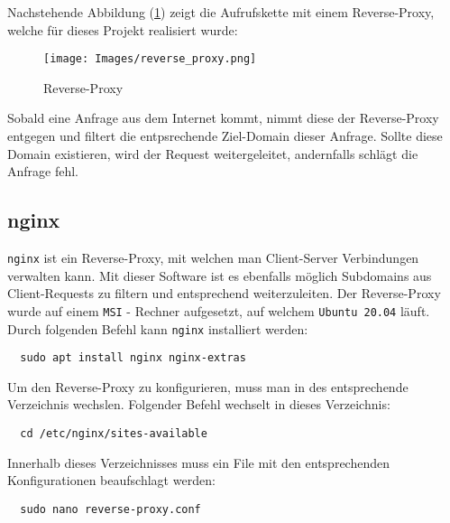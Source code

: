\documentclass[paper=a4,12pt]{scrreprt}
\begin{document}
Nachstehende Abbildung (\ref{fig:reverse_proxy}) zeigt die Aufrufskette mit einem Reverse-Proxy, welche für dieses Projekt realisiert wurde:\newline

\begin{figure}[H]
  \centering
  \texttt{[image: Images/reverse\_proxy.png]}
  \caption{Reverse-Proxy}
  \label{fig:reverse_proxy}
\end{figure}

Sobald eine Anfrage aus dem Internet kommt, nimmt diese der Reverse-Proxy entgegen und filtert die entpsrechende Ziel-Domain dieser Anfrage. Sollte diese Domain existieren, wird der Request weitergeleitet, andernfalls schlägt die Anfrage fehl.\newline


\subsection{nginx}
\label{ssec:nginx}

\texttt{nginx}\cite{nginx} ist ein Reverse-Proxy, mit welchen man Client-Server Verbindungen verwalten kann. Mit dieser Software ist es ebenfalls möglich Subdomains aus Client-Requests zu filtern und entsprechend weiterzuleiten.\newline
Der Reverse-Proxy wurde auf einem \texttt{MSI} - Rechner aufgesetzt, auf welchem \texttt{Ubuntu 20.04} läuft. Durch folgenden Befehl kann \texttt{nginx} installiert werden:\newline

\begin{lstlisting}
  sudo apt install nginx nginx-extras
\end{lstlisting}

Um den Reverse-Proxy zu konfigurieren, muss man in des entsprechende Verzeichnis wechslen. Folgender Befehl wechselt in dieses Verzeichnis:\newline

\begin{lstlisting}
  cd /etc/nginx/sites-available
\end{lstlisting}

Innerhalb dieses Verzeichnisses muss ein File mit den entsprechenden Konfigurationen beaufschlagt werden:\newline

\begin{lstlisting}
  sudo nano reverse-proxy.conf
\end{lstlisting}
\end{document}
